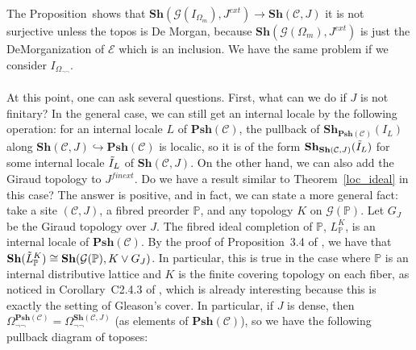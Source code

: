 \documentclass{article}
\newcommand{\pcat}{\mathbb{P}}
\begin{document}
The Proposition~shows that $\mathbf{Sh}(\mathcal{G}(I_{\Omega_m}),J^{ext})\xrightarrow{}\mathbf{Sh}(\mathcal{C},J)$ it is not surjective unless the topos is De Morgan, because $\mathbf{Sh}(\mathcal{G}(\Omega_m),J^{ext})$ is just the DeMorganization of $\mathcal{E}$ which is an inclusion. We have the same problem if we consider $I_{\Omega_{\neg\neg}}$.\\
\\
At this point, one can ask several questions. First, what can we do if $J$ is not finitary? In the general case, we can still get an internal locale by the following operation: for an internal locale $L$ of $\mathbf{Psh}(\mathcal{C})$, the pullback of $\mathbf{Sh}_{\mathbf{Psh}(\mathcal{C})}(I_L)$ along $\mathbf{Sh}(\mathcal{C},J)\hookrightarrow{}\mathbf{Psh}(\mathcal{C})$ is localic, so it is of the form $\mathbf{Sh}_{\mathbf{Sh}(\mathcal{C},J)}(\Tilde{I}_L)$ for some internal locale $\Tilde{I}_L$ of $\mathbf{Sh}(\mathcal{C},J)$. On the other hand, we can also add the Giraud topology to $J^{finext}$. Do we have a result similar to Theorem~\ref{loc_ideal} in this case? The answer is positive, and in fact, we can state a more general fact: take a site $(\mathcal{C},J)$, a fibred preorder $\pcat$, and any topology $K$ on $\mathcal{G}(\pcat)$. Let $G_J$ be the Giraud topology over $J$. The fibred ideal completion of $\pcat$, $L_\pcat^K$, is an internal locale of $\mathbf{Psh}(\mathcal{C})$. By the proof of Proposition~3.4 of \cite{giraud1972classifying}, we have that $\mathbf{Sh}(\Tilde{L}_\pcat^K)\cong \mathbf{Sh}(\mathcal{G}(\pcat), K\lor G_J)$. In particular, this is true in the case where $\pcat$ is an internal distributive lattice and $K$ is the finite covering topology on each fiber, as noticed in Corollary~C2.4.3 of \cite{johnstone2002sketches}, which is already interesting because this is exactly the setting of Gleason's cover. In particular, if $J$ is dense, then $\Omega_{\neg\neg}^{\mathbf{Psh}(\mathcal{C})}=\Omega_{\neg\neg}^{\mathbf{Sh}(\mathcal{C},J)}$ (as elements of $\mathbf{Psh}(\mathcal{C})$), so we have the following pullback diagram of toposes:
\begin{center}
\end{center}
\end{document}
